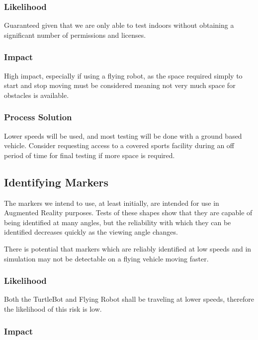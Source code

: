 \documentclass{article}
\begin{document}
	\subsubsection{Likelihood}
	
	Guaranteed given that we are only able to test indoors without obtaining a significant number of permissions and licenses. 
	
	\subsubsection{Impact}
	
	High impact, especially if using a flying robot, as the space required simply to start and stop moving must be considered meaning not very much space for obstacles is available.
	
	\subsubsection{Process Solution}
	
	Lower speeds will be used, and most testing will be done with a ground based vehicle. Consider requesting access to a covered sports facility during an off period of time for final testing if more space is required.
	

	\subsection{Identifying Markers}
	
	The markers we intend to use, at least initially, are intended for use in Augmented Reality purposes. Tests of these shapes show that they are capable of being identified at many angles, but the reliability with which they can be identified decreases quickly as the viewing angle changes. 
	
	There is potential that markers which are reliably identified at low speeds and in simulation may not be detectable on a flying vehicle moving faster.
	
		\subsubsection{Likelihood}
 
		Both the TurtleBot and Flying Robot shall be traveling at lower speeds, therefore the likelihood of this risk is low.
		
		\subsubsection{Impact}
		
\end{document}
